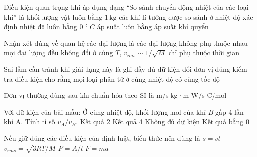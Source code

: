 \begin{ex}
Điều kiện quan trọng khi áp dụng dạng “So sánh chuyển động nhiệt của các loại khí” là
\choice
{khối lượng vật luôn bằng $1\,\text{kg}$}
{\True các khí lí tưởng được so sánh ở nhiệt độ xác định}
{nhiệt độ luôn bằng 0 ° $C$}
{áp suất luôn bằng áp suất khí quyển}
\end{ex}

\begin{ex}
Nhận xét đúng về quan hệ các đại lượng là
\choice
{các đại lượng không phụ thuộc nhau}
{mọi đại lượng đều không đổi}
{\True ở cùng $T$, $v_{rms}\sim1/\sqrt M$}
{chỉ phụ thuộc thời gian}
\end{ex}

\begin{ex}
Sai lầm cần tránh khi giải dạng này là
\choice
{ghi đầy đủ dữ kiện}
{đổi đơn vị đúng}
{kiểm tra điều kiện}
{\True cho rằng mọi loại phân tử ở cùng nhiệt độ có cùng tốc độ}
\end{ex}

\begin{ex}
Đơn vị thường dùng sau khi chuẩn hóa theo SI là
\choice
{\True m/s}
{kg·m}
{W/s}
{C/mol}
\end{ex}

\begin{ex}
Với dữ kiện của bài mẫu: Ở cùng nhiệt độ, khối lượng mol của khí $B$ gấp 4 lần khí A. Tính tỉ số $v_A/v_B$.
\choice
{\True Kết quả 2}
{Kết quả 4}
{Không đủ dữ kiện}
{Kết quả bằng 0}
\end{ex}

\begin{ex}
Nếu giữ đúng các điều kiện của định luật, biểu thức nên dùng là
\choice
{$s=vt$}
{\True $v_{rms}=\sqrt{3RT/M}$}
{$P=A/t$}
{$F=ma$}
\end{ex}

